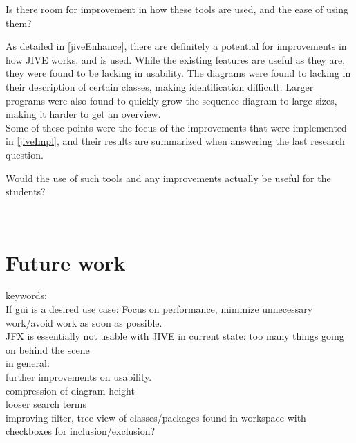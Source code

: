 \begin{theorem}
Is there room for improvement in how these tools are used, and the ease of using them?
\end{theorem}

As detailed in \autoref{jiveEnhance}, there are definitely a potential for improvements in how JIVE works, and is used.
While the existing features are useful as they are, they were found to be lacking in usability.
The diagrams were found to lacking in their description of certain classes, making identification difficult.
Larger programs were also found to quickly grow the sequence diagram to large sizes, making it harder to get an overview.
~\\

Some of these points were the focus of the improvements that were implemented in \autoref{jiveImpl}, and their results are summarized when answering the last research question.
~\\

\begin{theorem}
Would the use of such tools and any improvements actually be useful for the students?
\end{theorem}
~\\

\section{Future work}\label{conclusionFuture}
keywords:\\
If gui is a desired use case: Focus on performance, minimize unnecessary work/avoid work as soon as possible.\\
JFX is essentially not usable with JIVE in current state: too many things going on behind the scene\\

in general:\\
further improvements on usability.\\
compression of diagram height\\
looser search terms\\
improving filter, tree-view of classes/packages found in workspace with checkboxes for inclusion/exclusion?\\

